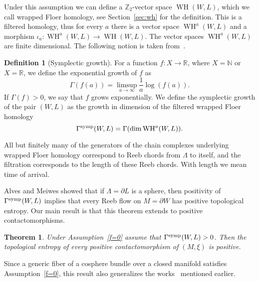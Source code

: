 \documentclass{amsart}
\newcommand{\NN}{\mathbb{N}}
\newcommand{\RR}{\mathbb{R}}
\newcommand{\ZZ}{\mathbb{Z}}
\newcommand{\WslantH}{\operatorname{WH}}
\newtheorem{theorem}{Theorem}
\theoremstyle{definition}
\newtheorem{definition}[proposition]{Definition}
\theoremstyle{remark}
\numberwithin{equation}{section}
\begin{document}
Under this assumption we can define a $\ZZ_2$-vector space $\WslantH(W,L)$, which we call wrapped Floer homology, see Section~\ref{sec:wh} for the definition. This is a filtered homology, thus for every $a$ there is a vector space $\WslantH^a(W,L)$ and a morphism $\iota_a:\WslantH^a(W,L)\to \WslantH(W,L)$. The vector spaces $\WslantH^a(W,L)$ are finite dimensional. The following notion is taken from~\cite{AM17}.
\begin{definition}[Symplectic growth]
	For a function $f:X\to\RR$, where $X=\NN$ or $X=\RR$, we define the exponential growth of $f$ as 
	\begin{equation*}
		\Gamma(f(a))=\limsup_{a\to\infty} \frac{1}{a}\log(f(a)).
	\end{equation*}
	If $\Gamma(f)>0$, we say that $f$ grows exponentially. We define the symplectic growth of the pair $(W,L)$ as the growth in dimension of the filtered wrapped Floer homology
	\begin{equation*}
		\Gamma^{\rm symp}(W,L)=\Gamma(\dim \WslantH^a(W,L)).
	\end{equation*}
\end{definition}
 
All but finitely many of the generators of the chain complexes underlying wrapped Floer homology correspond to Reeb chords from $\Lambda$ to itself, and the filtration corresponds to the length of these Reeb chords. With length we mean time of arrival.

Alves and Meiwes showed that if $\Lambda=\partial L$ is a sphere, then positivity of $\Gamma^{\rm symp}(W,L)$ implies that every Reeb flow on $M=\partial W$ has positive topological entropy. Our main result is that this theorem extends to positive contactomorphisms. 

\begin{theorem}\label{poscont}
	Under Assumption~\ref{f=0} assume that $\Gamma^{\rm symp}(W,L)>0$. Then the topological entropy of every positive contactomorphism of $(M,\xi)$ is positive.
\end{theorem}

Since a generic fiber of a cosphere bundle over a closed manifold satisfies Assumption~\ref{f=0}, this result also generalizes the works~\cite{MacSch11} mentioned earlier. 
\end{document}
